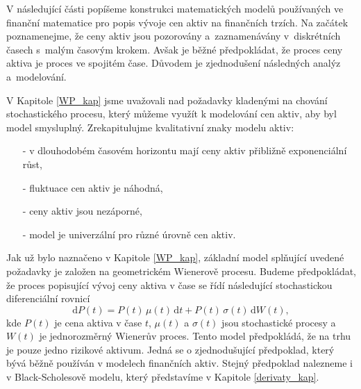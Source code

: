 \documentclass[a4paper,12pt]{report}
\theoremstyle{definition} \newtheorem{definice}[veta]{Definice}
\theoremstyle{remark}
\begin{document}
V následující části popíšeme konstrukci matematických modelů používaných ve finanční matematice pro popis vývoje cen aktiv na finančních trzích.
Na začátek poznamenejme, že ceny aktiv jsou pozorovány a~zaznamenávány v~diskrétních časech s~malým časovým krokem.
Avšak je běžné předpokládat, že proces ceny aktiva je proces ve spojitém čase.
Důvodem je zjednodušení následných analýz a~modelování.

V Kapitole \ref{WP_kap} jsme uvažovali nad požadavky kladenými na chování stochastického procesu, který můžeme využít k modelování cen aktiv, aby byl model smysluplný.
Zrekapitulujme kvalitativní znaky modelu aktiv:
\begin{itemize}
\item[-] v dlouhodobém časovém horizontu mají ceny aktiv přibližně exponenciální růst,
\item[-] fluktuace cen aktiv je náhodná,
\item[-] ceny aktiv jsou nezáporné,
\item[-] model je univerzální pro různé úrovně cen aktiv.
\end{itemize}
Jak už bylo naznačeno v Kapitole \ref{WP_kap}, základní model splňující uvedené požadavky je založen na geometrickém Wienerově procesu. 
Budeme předpokládat, že proces popisující vývoj ceny aktiva v čase se řídí následující stochastickou diferenciální rovnicí %
\begin{equation}\label{risk_asset_model}
\mathrm{d}P(t)=P(t)\,\mu(t)\,\mathrm{d}t+P(t)\,\sigma(t)\,\mathrm{d}W(t),
\end{equation}
kde $P(t)$ je cena aktiva v čase $t$, $\mu(t)$ a $\sigma(t)$ jsou stochastické procesy a~$W(t)$  je jednorozměrný Wienerův proces.
Tento model předpokládá, že na trhu je pouze jedno rizikové aktivum. %
Jedná se o zjednodušující předpoklad, který bývá běžně používán v modelech finančních aktiv. 
Stejný předpoklad nalezneme i v Black-Scholesově modelu, který představíme v Kapitole \ref{derivaty_kap}.
\end{document}
